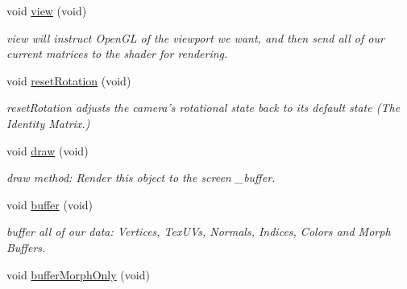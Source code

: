 \begin{DoxyCompactItemize}
void \hyperlink{class_camera_ae845a36306bba6b6e359cbdddce65f7f}{view} (void)
\begin{DoxyCompactList}\small\item\em view will instruct Open\-G\-L of the viewport we want, and then send all of our current matrices to the shader for rendering. \end{DoxyCompactList}\item 
void \hyperlink{class_camera_a8ec7938c5e25068e5bff25aeb7038af4}{reset\-Rotation} (void)
\begin{DoxyCompactList}\small\item\em reset\-Rotation adjusts the camera's rotational state back to its default state (The Identity Matrix.) \end{DoxyCompactList}\item 
\hypertarget{class_object_a53e2ee7f548550be014126bed139fe69}{void \hyperlink{class_object_a53e2ee7f548550be014126bed139fe69}{draw} (void)}\label{class_object_a53e2ee7f548550be014126bed139fe69}

\begin{DoxyCompactList}\small\item\em draw method\-: Render this object to the screen \-\_\-buffer. \end{DoxyCompactList}\item 
\hypertarget{class_object_a7edb92c30d86b6479b0ff2a5e9f06e13}{void \hyperlink{class_object_a7edb92c30d86b6479b0ff2a5e9f06e13}{buffer} (void)}\label{class_object_a7edb92c30d86b6479b0ff2a5e9f06e13}

\begin{DoxyCompactList}\small\item\em buffer all of our data\-: Vertices, Tex\-U\-Vs, Normals, Indices, Colors and Morph Buffers. \end{DoxyCompactList}\item 
\hypertarget{class_object_a293792abfe0671e00a0ec10e85ea9d9e}{void \hyperlink{class_object_a293792abfe0671e00a0ec10e85ea9d9e}{buffer\-Morph\-Only} (void)}\label{class_object_a293792abfe0671e00a0ec10e85ea9d9e}


\end{DoxyCompactItemize}
